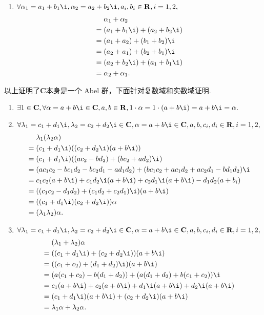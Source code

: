 \begin{solution}
\begin{enumerate}
\begin{enumerate}
                    \item $\forall \alpha_1 = a_1+b_1\i, \alpha_2 = a_2+b_2\i, a_i, b_i \in \mathbf{R}, i = 1, 2,$
                    \begin{align*}
                        & \alpha_1+\alpha_2 \\ ={} & (a_1+b_1\i)+(a_2+b_2\i) \\ ={} &(a_1+a_2)+(b_1+b_2)\i \\ ={} & (a_2+a_1)+(b_2+b_1)\i \\ ={} & (a_2+b_2\i)+(a_1+b_1\i) \\ ={} & \alpha_2+\alpha_1.
                    \end{align*}
                \end{enumerate}
                以上证明了$\mathbf{C}$本身是一个 Abel 群，下面针对复数域和实数域证明.
                \begin{enumerate}
                    \item $\exists 1 \in \mathbf{C}, \forall \alpha = a+b\i \in \mathbf{C}, a, b \in \mathbf{R}, 1 \cdot \alpha = 1 \cdot (a+b\i) = a+b\i = \alpha.$

                    \item $\forall \lambda_1 = c_1+d_1\i, \lambda_2 = c_2+d_2\i \in \mathbf{C}, \alpha = a+b\i \in \mathbf{C}, a, b, c_i, d_i \in \mathbf{R}, i = 1, 2,$
                    \begin{align*}
                        & \lambda_1(\lambda_2 \alpha) \\ ={} & (c_1+d_1\i)((c_2+d_2\i)(a+b\i)) \\ ={} & (c_1+d_1\i)((ac_2-bd_2)+(bc_2+ad_2)\i) \\ ={} & (ac_1c_2-bc_1d_2-bc_2d_1-ad_1d_2)+(bc_1c_2+ac_1d_2+ac_2d_1-bd_1d_2)\i \\ ={} & c_1c_2(a+b\i)+c_1d_2\i(a+b\i)+c_2d_1\i(a+b\i)-d_1d_2(a+b_i) \\ ={} & ((c_1c_2-d_1d_2)+(c_1d_2+c_2d_1)\i)(a+b\i) \\ ={} & ((c_1+d_1\i)(c_2+d_2\i))\alpha \\ ={} & (\lambda_1 \lambda_2)\alpha.
                    \end{align*}

                    \item $\forall \lambda_1 = c_1+d_1\i, \lambda_2 = c_2+d_2\i \in \mathbf{C}, \alpha = a+b\i \in \mathbf{C}, a, b, c_i, d_i \in \mathbf{R}, i = 1, 2,$
                    \begin{align*}
                        & (\lambda_1 + \lambda_2) \alpha \\ ={} & ((c_1+d_1\i)+(c_2+d_2\i))(a+b\i) \\ ={} & ((c_1+c_2)+(d_1+d_2)\i)(a+b\i) \\ ={} & (a(c_1+c_2)-b(d_1+d_2))+(a(d_1+d_2)+b(c_1+c_2))\i \\ ={} & c_1(a+b\i)+c_2(a+b\i)+d_1\i(a+b\i)+d_2\i(a+b\i) \\ ={} & (c_1+d_1\i)(a+b\i)+(c_2+d_2\i)(a+b\i) \\ ={} & \lambda_1\alpha+\lambda_2\alpha.
                    \end{align*}


\end{enumerate}
\end{enumerate}
\end{solution}
